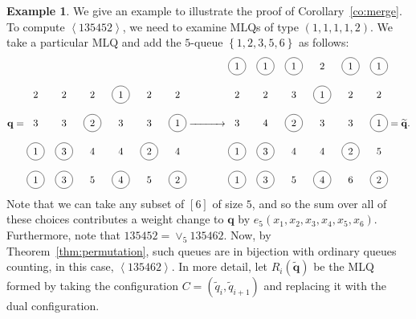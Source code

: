 \documentclass[reqno]{amsart}
\newcommand{\0}{\phantom{c}}
\newcommand{\swt}[1]{\left\langle #1 \right\rangle} %
\newcommand{\merge}[1]{\vee_{#1}} %
\newcommand{\qq}{\mathbf{q}}
\newcommand{\set}[1]{\left\{ #1 \right\}}
\newcommand{\ive}[1]{\left[ #1 \right]}
\theoremstyle{plain}
\theoremstyle{definition}
\newtheorem{example}[thm]{Example}
\numberwithin{equation}{section}
\begin{document}
\begin{example}
We give an example to illustrate the proof of Corollary~\ref{co:merge}.
To compute $\swt{135452}$, we need to examine MLQs of type $(1,1,1,1,2)$.
We take a particular MLQ and add the $5$-queue $\set{1,2,3,5,6}$ as follows:
\[
\qq =
\begin{tikzpicture}[baseline=82]
\node at (0, 4){2};\node at (1, 4){2};\node at (2, 4){2};\node[circle, draw=black] at (3, 4){1};\node at (4, 4){2};\node at (5, 4){2};\node at (0, 3){3};\node at (1, 3){3};\node[circle, draw=black] at (2, 3){2};\node at (3, 3){3};\node at (4, 3){3};\node[circle, draw=black] at (5, 3){1};\node[circle, draw=black] at (0, 2){1};\node[circle, draw=black] at (1, 2){3};\node at (2, 2){4};\node at (3, 2){4};\node[circle, draw=black] at (4, 2){2};\node at (5, 2){4};\node[circle, draw=black] at (0, 1){1};\node[circle, draw=black] at (1, 1){3};\node at (2, 1){5};\node[circle, draw=black] at (3, 1){4};\node at (4, 1){5};\node[circle, draw=black] at (5, 1){2};
\end{tikzpicture}
\xrightarrow{\hspace{30pt}}
\begin{tikzpicture}[baseline=82]
\node[circle, draw=black] at (0, 5){1};\node[circle, draw=black] at (1, 5){1};\node[circle, draw=black] at (2, 5){1};\node at (3, 5){2};\node[circle, draw=black] at (4, 5){1};\node[circle, draw=black] at (5, 5){1};\node at (0, 4){2};\node at (1, 4){2};\node at (2, 4){3};\node[circle, draw=black] at (3, 4){1};\node at (4, 4){2};\node at (5, 4){2};\node at (0, 3){3};\node at (1, 3){4};\node[circle, draw=black] at (2, 3){2};\node at (3, 3){3};\node at (4, 3){3};\node[circle, draw=black] at (5, 3){1};\node[circle, draw=black] at (0, 2){1};\node[circle, draw=black] at (1, 2){3};\node at (2, 2){4};\node at (3, 2){4};\node[circle, draw=black] at (4, 2){2};\node at (5, 2){5};\node[circle, draw=black] at (0, 1){1};\node[circle, draw=black] at (1, 1){3};\node at (2, 1){5};\node[circle, draw=black] at (3, 1){4};\node at (4, 1){6};\node[circle, draw=black] at (5, 1){2};
\end{tikzpicture}
= \widetilde{\qq}.
\]
Note that we can take any subset of $\ive{6}$ of size $5$, and so the sum over all of these choices contributes a weight change to $\qq$ by $e_5(x_1, x_2, x_3, x_4, x_5, x_6)$.
Furthermore, note that $135452 = \merge{5} 135462$.
Now, by Theorem~\ref{thm:permutation}, such queues are in bijection with ordinary queues counting, in this case, $\swt{135462}$.
In more detail, let $R_i(\widetilde{\qq})$ be the MLQ formed by taking the configuration $C = (\widetilde{q}_i, \widetilde{q}_{i+1})$ and replacing it with the dual configuration.

\end{example}
\end{document}
